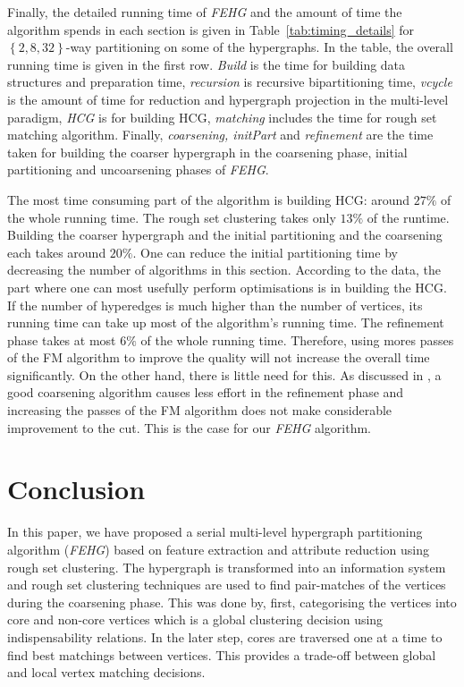 \documentclass[twocolumn]{svjour3}          \smartqed
\begin{document}
Finally, the detailed running time of \textit{FEHG} and the amount of time the algorithm spends in each section is given in Table~\ref{tab:timing_details} for $\left\lbrace  2,8,32 \right\rbrace$-way partitioning on some of the hypergraphs. In the table, the overall running time is given in the first row. \textit{Build} is the time for building data structures and preparation time, \textit{recursion} is recursive bipartitioning time, \textit{vcycle} is the amount of time for reduction and hypergraph projection in the multi-level paradigm, \textit{HCG} is for building HCG, \textit{matching} includes the time for rough set matching algorithm. Finally, 
\textit{coarsening, initPart} and \textit{refinement} are the time taken for building the coarser hypergraph in the coarsening phase, initial partitioning and uncoarsening phases of \textit{FEHG}. 

The most time consuming part of the algorithm is building HCG: around $27\%$ of the whole running time. The rough set clustering takes only $13\%$ of the runtime. Building the coarser hypergraph and the initial partitioning and the coarsening each takes around $20\%$. One can reduce the initial partitioning time by decreasing the number of algorithms in this section. According to the data, the part where one can most usefully perform optimisations is in building the HCG.  If the number of hyperedges is much higher than the number of vertices, its running time can take up most of the algorithm's running time. The refinement phase takes at most $6\%$ of the whole running time. Therefore, using mores passes of the FM algorithm to improve the quality will not increase the overall time significantly. On the other hand, there is little need for this. As discussed in \cite{karytech2002}, a good coarsening algorithm causes less effort in the refinement phase and increasing the passes of the FM algorithm does not make considerable improvement to the cut. This is the case for our \textit{FEHG} algorithm. 


\section{Conclusion}\label{sec:conclusion}

In this paper, we have proposed a serial multi-level hypergraph partitioning algorithm (\textit{FEHG}) based on feature extraction and attribute reduction using rough set clustering. The hypergraph is transformed into an information system and rough set clustering techniques are used to find pair-matches of the vertices during the coarsening phase. This was done by, first, categorising the vertices into core and non-core vertices which is a global clustering decision using indispensability relations. In the later step, cores are traversed one at a time to find best matchings between vertices. This provides a trade-off between global and local vertex matching decisions.
\end{document}
